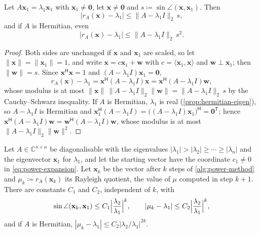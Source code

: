 \begin{proposition}
\label{prop:rayleigh-error}
Let $A\mathbf x_1=\lambda_1\mathbf x_1$ with $\mathbf x_1\ne\mathbf 0$, let $\mathbf x\ne\mathbf 0$ and $s\coloneqq\sin\angle(\mathbf x,\mathbf x_1)$. Then
\[
|r_A(\mathbf x)-\lambda_1|\le\|A-\lambda_1I\|_2\,s ,
\]
and if $A$ is Hermitian, even
\[
|r_A(\mathbf x)-\lambda_1|\le\|A-\lambda_1I\|_2\,s^2 .
\]
\end{proposition}

\begin{proof}
Both sides are unchanged if $\mathbf x$ and $\mathbf x_1$ are scaled, so let $\|\mathbf x\|=\|\mathbf x_1\|=1$, and write $\mathbf x=c\mathbf x_1+\mathbf w$ with $c=\langle\mathbf x_1,\mathbf x\rangle$ and $\mathbf w\perp\mathbf x_1$; then $\|\mathbf w\|=s$. Since $\mathbf x^{\mathsf H}\mathbf x=1$ and $(A-\lambda_1I)\mathbf x_1=\mathbf 0$,
\[
r_A(\mathbf x)-\lambda_1=\mathbf x^{\mathsf H}(A-\lambda_1I)\mathbf x=\mathbf x^{\mathsf H}(A-\lambda_1I)\mathbf w ,
\]
whose modulus is at most $\|\mathbf x\|\,\|A-\lambda_1I\|_2\|\mathbf w\|=\|A-\lambda_1I\|_2\,s$ by the Cauchy--Schwarz inequality. If $A$ is Hermitian, $\lambda_1$ is real (\cref{prop:hermitian-eigen}), so $A-\lambda_1I$ is Hermitian and $\mathbf x_1^{\mathsf H}(A-\lambda_1I)=\bigl((A-\lambda_1I)\mathbf x_1\bigr)^{\mathsf H}=\mathbf 0^{\mathsf T}$; hence $\mathbf x^{\mathsf H}(A-\lambda_1I)\mathbf w=\mathbf w^{\mathsf H}(A-\lambda_1I)\mathbf w$, whose modulus is at most $\|A-\lambda_1I\|_2\|\mathbf w\|^2$.
\end{proof}

\begin{theorem}
\label{thm:power-method}
Let $A\in\mathbb C^{n\times n}$ be diagonalisable with the eigenvalues $|\lambda_1|>|\lambda_2|\ge\cdots\ge|\lambda_n|$ and the eigenvector $\mathbf x_1$ for $\lambda_1$, and let the starting vector have the coordinate $c_1\ne0$ in \eqref{eq:power-expansion}. Let $\mathbf x_k$ be the vector after $k$ steps of \cref{alg:power-method} and $\mu_k\coloneqq r_A(\mathbf x_k)$ its Rayleigh quotient, the value of $\mu$ computed in step $k+1$. There are constants $C_1$ and $C_2$, independent of $k$, with
\[
\sin\angle(\mathbf x_k,\mathbf x_1)\le C_1\Bigl|\frac{\lambda_2}{\lambda_1}\Bigr|^k,\qquad|\mu_k-\lambda_1|\le C_2\Bigl|\frac{\lambda_2}{\lambda_1}\Bigr|^k ,
\]
and if $A$ is Hermitian, $|\mu_k-\lambda_1|\le C_2|\lambda_2/\lambda_1|^{2k}$.
\end{theorem}


